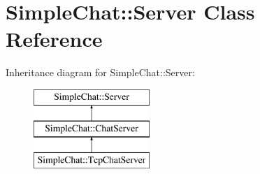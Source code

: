 \hypertarget{classSimpleChat_1_1Server}{\section{Simple\-Chat\-:\-:Server Class Reference}
\label{classSimpleChat_1_1Server}
}
Inheritance diagram for Simple\-Chat\-:\-:Server\-:\begin{figure}[H]
\begin{center}
\leavevmode
\includegraphics[height=3.000000cm]{classSimpleChat_1_1Server}
\end{center}
\end{figure}
